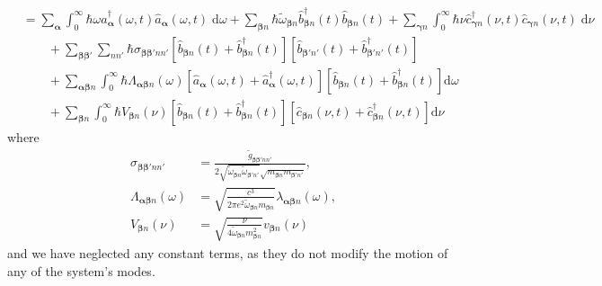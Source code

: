 \documentclass{article}
\begin{document}
\begin{equation}
\begin{split}
&= \sum_{\bm{\alpha}}\int_0^\infty\hbar\omega\hat{a}_{\bm{\alpha}}^\dagger(\omega,t)\hat{a}_{\bm{\alpha}}(\omega,t)\;\mathrm{d}\omega + \sum_{\bm{\beta}n}\hbar\tilde{\omega}_{\bm{\beta}n}\hat{b}_{\bm{\beta}n}^\dagger(t)\hat{b}_{\bm{\beta}n}(t) + \sum_{\bm{\gamma}n}\int_0^\infty\hbar\nu\hat{c}_{\bm{\gamma}n}^\dagger(\nu,t)\hat{c}_{\bm{\gamma}n}(\nu,t)\;\mathrm{d}\nu\\
&\qquad + \sum_{\bm{\beta}\bm{\beta}'}\sum_{nn'}\hbar\sigma_{\bm{\beta}\bm{\beta}'nn'}\left[\hat{b}_{\bm{\beta}n}(t) + \hat{b}_{\bm{\beta}n}^\dagger(t)\right]\left[\hat{b}_{\bm{\beta}'n'}(t) + \hat{b}_{\bm{\beta}'n'}^\dagger(t)\right]\\
&\qquad + \sum_{\bm{\alpha}\bm{\beta}n}\int_0^\infty\hbar\Lambda_{\bm{\alpha}\bm{\beta}n}(\omega)\left[\hat{a}_{\bm{\alpha}}(\omega,t) + \hat{a}_{\bm{\alpha}}^\dagger(\omega,t)\right]\left[\hat{b}_{\bm{\beta}n}(t) + \hat{b}_{\bm{\beta}n}^\dagger(t)\right]\mathrm{d}\omega\\
&\qquad + \sum_{\bm{\beta}n}\int_0^\infty\hbar V_{\bm{\beta}n}(\nu)\left[\hat{b}_{\bm{\beta}n}(t) + \hat{b}_{\bm{\beta}n}^\dagger(t)\right]\left[\hat{c}_{\bm{\beta}n}(\nu,t) + \hat{c}_{\bm{\beta}n}^\dagger(\nu,t)\right]\mathrm{d}\nu
\end{split}
\end{equation}
where
\begin{equation}
\begin{split}
\sigma_{\bm{\beta}\bm{\beta}'nn'} &= \frac{\tilde{g}_{\bm{\beta}\bm{\beta}'nn'}}{2\sqrt{\tilde{\omega}_{\bm{\beta}n}\tilde{\omega}_{\bm{\beta}'n'}}\sqrt{m_{\bm{\beta}n}m_{\bm{\beta}'n'}}},\\
\Lambda_{\bm{\alpha}\bm{\beta}n}(\omega) &= \sqrt{\frac{c^3}{2\pi e^2\tilde{\omega}_{\bm{\beta}n}m_{\bm{\beta}n}}}\lambda_{\bm{\alpha}\bm{\beta}n}(\omega),\\
 V_{\bm{\beta}n}(\nu) &= \sqrt{\frac{\nu}{4\tilde{\omega}_{\bm{\beta}n}m^2_{\bm{\beta}n}}}v_{\bm{\beta}n}(\nu)
\end{split}
\end{equation}
and we have neglected any constant terms, as they do not modify the motion of any of the system's modes.
\end{document}
